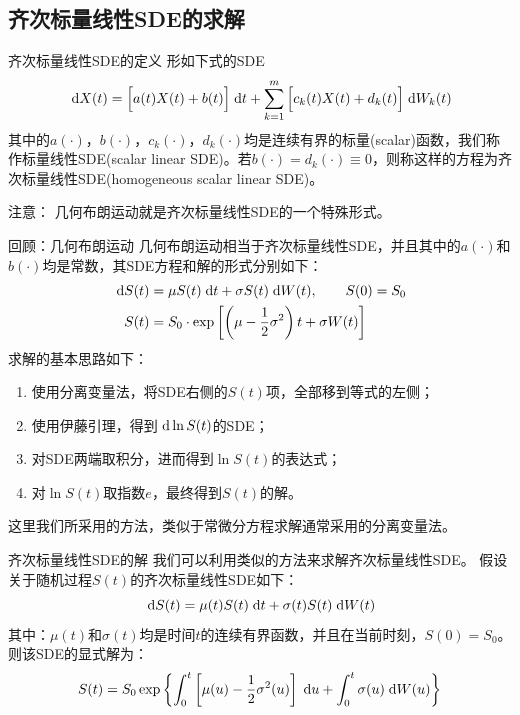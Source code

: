 \documentclass[t]{beamer}
\newcommand{\dif}{{\;\rm d}}
\begin{document}
\subsection{齐次标量线性SDE的求解}
\begin{frame}{齐次标量线性SDE的定义}
形如下式的SDE
$$\dif X(t)=\Big[a(t)X(t)+b(t)\Big]\dif t+\sum^m_{k=1}\Big[c_k(t)X(t)+d_k(t)\Big]\dif W_k(t)$$
其中的$a(\cdot)$，$b(\cdot)$，$c_k(\cdot )$，$d_k(\cdot )$均是连续有界的标量(scalar)函数，我们称作标量线性SDE(scalar linear SDE)。若$b(\cdot)=d_k(\cdot)\equiv 0$，则称这样的方程为齐次标量线性SDE(homogeneous scalar linear SDE)。

\begin{block}{注意：}
几何布朗运动就是齐次标量线性SDE的一个特殊形式。
\end{block}

\end{frame}

\begin{frame}{回顾：几何布朗运动}
\normalsize
几何布朗运动相当于齐次标量线性SDE，并且其中的$a(\cdot)$和$b(\cdot)$均是常数，其SDE方程和解的形式分别如下：
\[
\begin{split}
\dif S(t)&=\mu S(t)\dif t+\sigma S(t) \dif W(t),\qquad S(0)=S_0\\
S(t)&=S_0\cdot \exp\left[\left(\mu-\frac{1}{2}\sigma^2 \right)t+ \sigma W(t)\right]\\
\end{split}\]
求解的基本思路如下：
\begin{enumerate}
\item 使用分离变量法，将SDE右侧的$S(t)$项，全部移到等式的左侧；
\item 使用伊藤引理，得到$\dif \ln S(t)$的SDE；
\item 对SDE两端取积分，进而得到$\ln S(t)$的表达式；
\item 对$\ln S(t)$取指数$e$，最终得到$S(t)$的解。
\end{enumerate}
这里我们所采用的方法，类似于常微分方程求解通常采用的分离变量法。
\end{frame}

\begin{frame}{齐次标量线性SDE的解}
我们可以利用类似的方法来求解齐次标量线性SDE。
假设关于随机过程$S(t)$的齐次标量线性SDE如下：
\begin{equation*}
\dif S(t)=\mu(t) S(t)\dif t+\sigma(t) S(t) \dif W(t)
\end{equation*}
其中：$\mu(t)$和$\sigma(t)$均是时间$t$的连续有界函数，并且在当前时刻，$S(0)=S_0$。
则该SDE的显式解为：
\begin{equation*}
S(t)=S_0\exp\left\{\int^t_0\left[\mu(u)-\frac{1}{2}\sigma^2(u) \right]\dif u+ \int^t_0\sigma(u) \dif W(u) \right\}
\end{equation*}
\end{frame}
\end{document}
